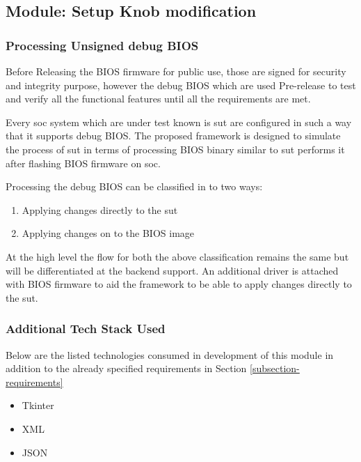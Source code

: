 \subsection{Module: Setup Knob modification}\label{module-setup-knob-modification}

\subsubsection{Processing Unsigned debug BIOS}\label{subsection-processing-bios}
Before Releasing the BIOS firmware for public use, those are signed for security and integrity purpose, however the debug BIOS which are used Pre-release to test and verify all the functional features until all the requirements are met.

Every \gls{soc} system which are under test known is \gls{sut} are configured in such a way that it supports debug BIOS. The proposed framework is designed to simulate the process of \gls{sut} in terms of processing BIOS binary similar to \gls{sut} performs it after flashing BIOS firmware on \gls{soc}.

Processing the debug BIOS can be classified in to two ways:
\begin{enumerate}\label{cli-classification-proposed-work}
	\item Applying changes directly to the \gls{sut}
	\item Applying changes on to the BIOS image
\end{enumerate}

At the high level the flow for both the above classification remains the same but will be differentiated at the backend support. An additional driver is attached with BIOS firmware to aid the framework to be able to apply changes directly to the \gls{sut}.

\subsubsection{Additional Tech Stack Used}
Below are the listed technologies consumed in development of this module in addition to the already specified requirements in Section \ref{subsection-requirements}
\begin{itemize}
	\item Tkinter
	\item XML
	\item JSON
\end{itemize}


